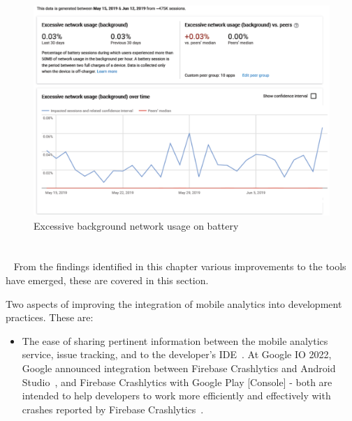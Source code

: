 \begin{figure}[!htbp]
    \centering
    \includegraphics[width=\textwidth, keepaspectratio]{images/android-vitals-screenshots/kiwix/Excessive_network_usage_by_kiwix_15_jun_2019.pdf}
    \caption{Excessive background network usage on battery}
    \label{fig:android_vitals_excessive_network_usage}
\end{figure}











\section{\itools}~\label{tata-itools-section}
From the findings identified in this chapter various improvements to the tools have emerged, these are covered in this section.

Two aspects of improving the integration of mobile analytics into development practices. These are:

\begin{itemize}
    \item The ease of sharing pertinent information between the mobile analytics service, issue tracking, and to the developer's IDE~. At Google IO 2022, Google announced integration between Firebase Crashlytics and Android Studio~, and Firebase Crashlytics with Google Play [Console] - both are intended to help developers to work more efficiently and effectively with crashes reported by Firebase Crashlytics~.
\end{itemize}
 


